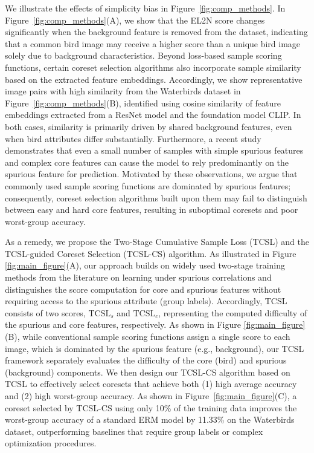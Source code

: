 \documentclass[letter,11pt]{article}
\begin{document}
We illustrate the effects of simplicity bias in Figure~\ref{fig:comp_methods}. In Figure~\ref{fig:comp_methods}(A), we show that the EL2N score changes significantly when the background feature is removed from the dataset, indicating that a common bird image may receive a higher score than a unique bird image solely due to background characteristics. Beyond loss-based sample scoring functions, certain coreset selection algorithms also incorporate sample similarity based on the extracted feature embeddings. Accordingly, we show representative image pairs with high similarity from the Waterbirds dataset in Figure~\ref{fig:comp_methods}(B), identified using cosine similarity of feature embeddings extracted from a ResNet model and the foundation model CLIP. In both cases, similarity is primarily driven by shared background features, even when bird attributes differ substantially. Furthermore, a recent study~\citep{MS_DP} demonstrates that even a small number of samples with simple spurious features and complex core features can cause the model to rely predominantly on the spurious feature for prediction. Motivated by these observations, we argue that commonly used sample scoring functions are dominated by spurious features; consequently, coreset selection algorithms built upon them may fail to distinguish between easy and hard core features, resulting in suboptimal coresets and poor worst-group accuracy.

As a remedy, we propose the Two-Stage Cumulative Sample Loss (TCSL) and the TCSL-guided Coreset Selection (TCSL-CS) algorithm. As illustrated in Figure \ref{fig:main_figure}(A), our approach builds on widely used two-stage training methods from the literature on learning under spurious correlations \citep{LC, LFF, uLA, MAT} and distinguishes the score computation for core and spurious features without requiring access to the spurious attribute (group labels). Accordingly, TCSL consists of two scores, $\text{TCSL}_s$ and $\text{TCSL}_c$, representing the computed difficulty of the spurious and core features, respectively. As shown in Figure \ref{fig:main_figure}(B), while conventional sample scoring functions assign a single score to each image, which is dominated by the spurious feature (e.g., background), our TCSL framework separately evaluates the difficulty of the core (bird) and spurious (background) components. We then design our TCSL-CS algorithm based on TCSL to effectively select coresets that achieve both (1) high average accuracy and (2) high worst-group accuracy. As shown in Figure~\ref{fig:main_figure}(C), a coreset selected by TCSL-CS using only 10\% of the training data improves the worst-group accuracy of a standard ERM model by 11.33\% on the Waterbirds dataset, outperforming baselines that require group labels or complex optimization procedures.
\end{document}
